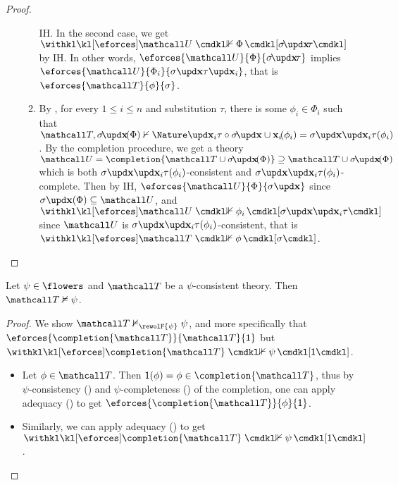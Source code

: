 \begin{proof}
\begin{itemize}
\begin{enumerate}
      IH. In the second case, we get
      $\neforces{\tU}{\Phi}{\restr{\sigma}{\bx}\tau}$ by IH. In other words,
      $\eforces{\tU}{\Phi}{\restr{\sigma}{\bx}\tau}$ implies
      $\eforces{\tU}{\Phi_i}{\update{\update{\sigma}{\bx}{\tau}}{\bx_i}{}}$,
      that is $\eforces{\tT}{\phi}{\sigma}$.
      \item By , for every $1 \leq i \leq n$ and
      substitution $\tau$, there is some $\phi_i \in \Phi_i$ such that $\tT,
      \restr{\sigma}{\bx}(\Phi) \nvdash{\Nature} \update{}{\bx_i}{\tau} \circ
      \restr{\sigma}{\bx \cup \bx_i}(\phi_i) =
      \update{\update{\sigma}{\bx}{}}{\bx_i}{\tau}(\phi_i)$. By the completion
      procedure, we get a theory $\tU = \completion{\tT \cup
      \restr{\sigma}{\bx}(\Phi)} \supseteq \tT \cup \restr{\sigma}{\bx}(\Phi)$
      which is both
      $\update{\update{\sigma}{\bx}{}}{\bx_i}{\tau}(\phi_i)$-consistent and
      $\update{\update{\sigma}{\bx}{}}{\bx_i}{\tau}(\phi_i)$-complete. Then by
      IH, $\eforces{\tU}{\Phi}{\update{\sigma}{\bx}{}}$ since
      $\update{\sigma}{\bx}{}(\Phi) \subseteq \tU$, and
      $\neforces{\tU}{\phi_i}{\update{\update{\sigma}{\bx}{}}{\bx_i}{\tau}}$
      since $\tU$ is
      $\update{\update{\sigma}{\bx}{}}{\bx_i}{\tau}(\phi_i)$-consistent, that is
      $\neforces{\tT}{\phi}{\sigma}$.
    \end{enumerate}
  \end{itemize}
\end{proof}

\begin{lemma}
  
  Let $\psi \in \flowers$ and $\tT$ be a $\psi$-consistent theory. Then $\tT
  \nvDash \psi$.
\end{lemma}
\begin{proof}
  We show $\tT \nvDash_{\rewolF{\psi}} \psi$, and more specifically that
  $\eforces{\completion{\tT}}{\tT}{\idsubst}$ but
  $\neforces{\completion{\tT}}{\psi}{\idsubst}$.
  \begin{itemize}
    \item Let $\phi \in \tT$. Then $\idsubst(\phi) = \phi \in \completion{\tT}$,
    thus by $\psi$-consistency () and
    $\psi$-completeness () of the completion, one
    can apply adequacy () to get
    $\eforces{\completion{\tT}}{\phi}{\idsubst}$.
    \item Similarly, we can apply adequacy () to get
    $\neforces{\completion{\tT}}{\psi}{\idsubst}$.
  \end{itemize}
\end{proof}

